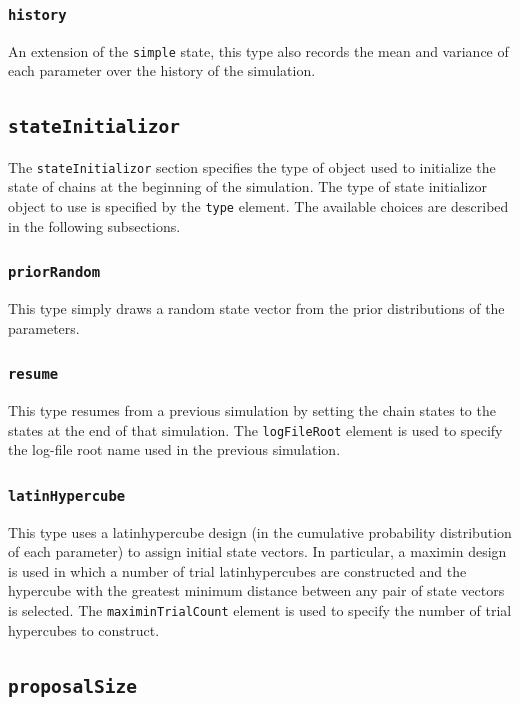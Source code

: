 \subsubsection{{\tt history}}

An extension of the {\tt simple} state, this type also records the mean and variance of each parameter over the history of the simulation.

\subsection{{\tt stateInitializor}}

The {\tt stateInitializor} section specifies the type of object used to initialize the state of chains at the beginning of the simulation. The type of state initializor object to use is specified by the {\tt type} element. The available choices are described in the following subsections.

\subsubsection{{\tt priorRandom}}

This type simply draws a random state vector from the prior distributions of the parameters.

\subsubsection{{\tt resume}}

This type resumes from a previous simulation by setting the chain states to the states at the end of that simulation. The {\tt logFileRoot} element is used to specify the log-file root name used in the previous simulation.

\subsubsection{{\tt latinHypercube}}

This type uses a \gls{latinhypercube} design (in the cumulative probability distribution of each parameter) to assign initial state vectors. In particular, a \gls{maximin} design is used in which a number of trial \glspl{latinhypercube} are constructed and the hypercube with the greatest minimum distance between any pair of state vectors is selected. The {\tt maximinTrialCount} element is used to specify the number of trial hypercubes to construct.

\subsection{{\tt proposalSize}}


